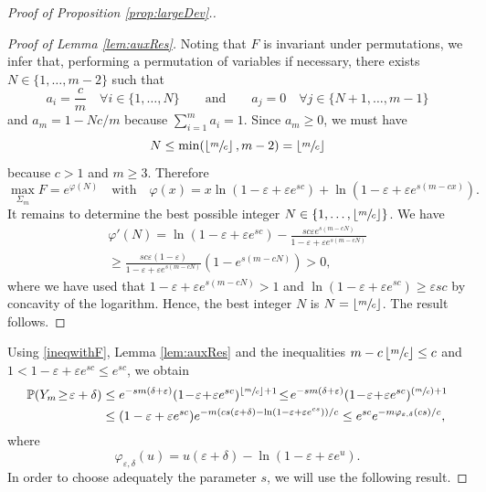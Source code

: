 \documentclass[10pt]{amsart}
\newcommand{\Psfrac}[2]{(\sfrac{#1}{#2})}
\theoremstyle{definition}
\begin{document}
\begin{proof}[Proof of Proposition \ref{prop:largeDev}.]
\begin{proof}[Proof of Lemma \ref{lem:auxRes}]
Noting that $F$ is invariant under permutations, we infer that, performing a permutation of variables if necessary, there exists $N\in \{ 1,\ldots,m-2\}$ such that
\[
a_i=\frac{c}{m}\quad \forall i\in \{ 1,\ldots,N\} \qquad\textrm{and}\qquad a_j=0\quad \forall j\in \{ N+1,\ldots,m-1\}
\]
and $a_m=1-Nc/m$ because $\sum_{i=1}^ma_i=1$. Since $a_m\geq 0$, we must have
\[
N\leq \min (\left \lfloor{\sfrac{m}{c}}\right \rfloor,m-2 )=\left \lfloor{\sfrac{m}{c}}\right \rfloor
\]
because $c>1$ and $m\geq 3$.
Therefore
\[
\max_{\Sigma_m}F=e^{\varphi(N)}\quad \text{with}\quad \varphi(x)=x\ln (1-\varepsilon+\varepsilon e^{sc})+\ln (1-\varepsilon+\varepsilon e^{s(m-cx)}).
\]
It remains to determine the best possible integer $N\in\{1,\ldots,\left\lfloor{\sfrac{m}{c}}\right \rfloor\}$. We have
\begin{multline*}
\varphi'(N) = \ln (1-\varepsilon+\varepsilon e^{sc})-\frac{sc\varepsilon e^{s(m-cN)}}{1-\varepsilon + \varepsilon e^{s(m-cN)}} \\
\geq \frac{sc\varepsilon (1-\varepsilon)}{1-\varepsilon + \varepsilon e^{s(m-cN)}}(1-e^{s(m-cN)})>0,
\end{multline*}
where we have used that $1-\varepsilon + \varepsilon e^{s(m-cN)}>1$ and $\ln (1-\varepsilon+\varepsilon e^{sc})\geq \varepsilon sc$ by concavity of the logarithm. Hence, the best integer $N$ is $N=\left \lfloor{\sfrac{m}{c}}\right \rfloor$. The result follows.
\end{proof}

Using \eqref{ineqwithF}, Lemma \ref{lem:auxRes} and the inequalities $m-c\left \lfloor{\sfrac{m}{c}}\right \rfloor\leq c$ and $1<1-\varepsilon+\varepsilon e^{sc}\leq e^{sc}$, we obtain
\begin{equation}
\begin{aligned}\label{eq1258}
\mathbb{P}( Y_m \!\geq\! \varepsilon + \delta) &\leq e^{-s m(\delta + \varepsilon)} (1\!-\!\varepsilon\!+\!\varepsilon e^{sc})^{\left \lfloor{\sfrac{m}{c}}\right \rfloor +1}
\!\leq\! e^{-s m(\delta + \varepsilon)} (1\!-\!\varepsilon\!+\!\varepsilon e^{sc})^{\Psfrac{m}{c} +1} \\
&\leq (1-\varepsilon+\varepsilon e^{sc}) e^{- m\left( cs(\varepsilon + \delta) - \ln( 1-\varepsilon+ \varepsilon e^{cs}) \right)/c}
\leq e^{sc} e^{- m\varphi_{\varepsilon,\delta}(cs)/c},
\end{aligned}
\end{equation}
where
\[
\varphi_{\varepsilon,\delta}(u)= u(\varepsilon + \delta) - \ln( 1-\varepsilon + \varepsilon e^{u}).
\]
In order to choose adequately the parameter $s$, we will use the following result.


\end{proof}
\end{document}

